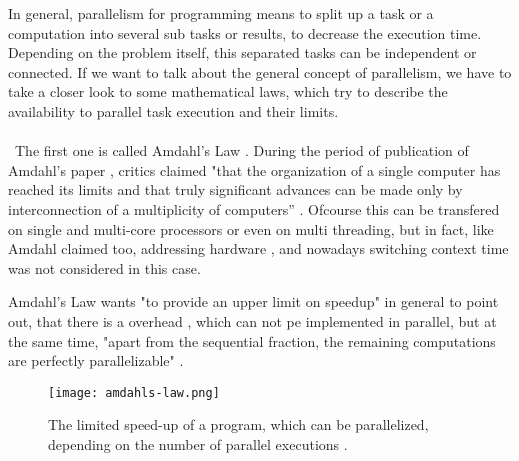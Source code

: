 In general, parallelism for programming means to split up a task or a computation into several sub tasks or results, to decrease the execution time. Depending on the problem itself, this separated tasks can be independent or connected. If we want to talk about the general concept of parallelism, we have to take a closer look to some mathematical laws, which try to describe the availability to parallel task execution and their limits.\\\\
\
The first one is called Amdahl's Law \parencite{inbook1}. During the period of publication of Amdahl's paper \parencite{book6}, critics claimed "that the organization of a single computer has reached its limits and that
truly significant advances can be made only by interconnection of a multiplicity of computers” \parencite[see][p80]{inbook1}. Ofcourse this can be transfered on single and multi-core processors or even on multi threading, but in fact, like Amdahl claimed too, addressing hardware \parencite{inbook1}, and nowadays switching context time was not considered in this case.

Amdahl's Law wants "to provide an upper limit on speedup" \parencite[see][p81]{inbook1} in general to point out, that there is a overhead \parencite{inbook1}, which can not pe implemented in parallel, but at the same time, "apart from the sequential fraction, the remaining computations are perfectly parallelizable" \parencite[see][p81]{inbook1}. 

\begin{figure}[h!]
	\centering
	\texttt{[image: amdahls-law.png]}
	\caption{
		The limited speed-up of a program, which can be parallelized, depending on the number of parallel executions \parencite{image1}.
	}
	\label{fig:admLaw}
\end{figure}

\newpage

